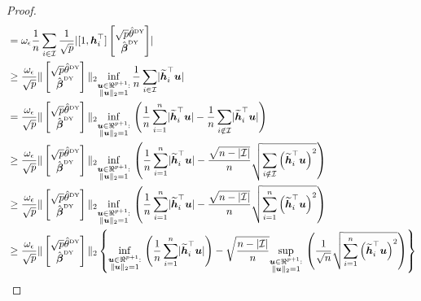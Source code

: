 \documentclass{article}
\makeatletter
\theoremstyle{definition}
\newcommand{\vnorm}[1]{%
	\ensuremath{%
		\if@display
		\left\| #1 \right\|
		\else
		\| #1 \|
		\fi
	}%
}
\newcommand{\abs}[1]{%
	\ensuremath{%
		\if@display
		\left| #1 \right|
		\else
		\lvert #1 \rvert
		\fi
	}%
}
\newcommand*{\bb}{\boldsymbol}
\newcommand{\betady}{\ensuremath{\hat{\bbeta}^{\textrm{\tiny DY}}}}
\newcommand{\thetady}{\ensuremath{\hat{\theta}^{\textrm{\tiny DY}}}}
\def\bu{\bb{u}}
\def\bh{\bb{h}}
\def\bbeta{\bb{\beta}}
\makeatother
\begin{document}
\begin{bibunit}
\begin{proof}
\begin{equation}
\begin{aligned}
		& = \omega_\epsilon\frac{1}{n} \sum_{i \in \mathcal I} \frac{1}{\sqrt{p}} \abs{ [1, \bh_i^\top] \begin{bmatrix} \sqrt{p} \thetady \\ \betady \end{bmatrix}} \\
		&\geq  \frac{\omega_\epsilon}{\sqrt{p}} \vnorm{\begin{bmatrix} \sqrt{p} \thetady \\ \betady \end{bmatrix}}_2   \underset{\substack{\bu \in \Re^{p+1}: \\ \vnorm{\bu}_2  = 1}}{\inf} \, \frac{1}{n} \sum_{i \in \mathcal I} \abs{ \widetilde{\bh}_i^\top \bu } \\
		&=  \frac{\omega_\epsilon}{\sqrt{p}} \vnorm{\begin{bmatrix} \sqrt{p} \thetady \\ \betady \end{bmatrix}}_2   \underset{\substack{\bu \in \Re^{p+1}: \\ \vnorm{\bu}_2  = 1}}{\inf} \, \left( \frac{1}{n}\sum_{i = 1}^n \abs{ \widetilde{\bh}_i^\top \bu }  - \frac{1}{n}\sum_{i \notin \mathcal{I}} \abs{ \widetilde{\bh}_i^\top \bu }\right)\\
		&\geq \frac{\omega_\epsilon}{\sqrt{p}} \vnorm{\begin{bmatrix} \sqrt{p} \thetady \\ \betady \end{bmatrix}}_2   \underset{\substack{\bu \in \Re^{p+1}: \\ \vnorm{\bu}_2  = 1}}{\inf} \, \left( \frac{1}{n}\sum_{i = 1}^n \abs{ \widetilde{\bh}_i^\top \bu }  - \frac{\sqrt{n - \abs{\mathcal I}}}{n} \sqrt{ \sum_{i \notin \mathcal{I}}  \left(\widetilde{\bh}_i^\top \bu \right)^2 }\right)\\
		&\geq  \frac{\omega_\epsilon}{\sqrt{p}} \vnorm{\begin{bmatrix} \sqrt{p} \thetady \\ \betady \end{bmatrix}}_2   \underset{\substack{\bu \in \Re^{p+1}: \\ \vnorm{\bu}_2  = 1}}{\inf} \, \left( \frac{1}{n}\sum_{i = 1}^n \abs{ \widetilde{\bh}_i^\top \bu }  - \frac{\sqrt{n - \abs{\mathcal I}}}{n} \sqrt{ \sum_{i = 1}^n  \left(\widetilde{\bh}_i^\top\bu \right)^2 }\right)\\
		&\geq  \frac{\omega_\epsilon}{\sqrt{p}} \vnorm{\begin{bmatrix} \sqrt{p} \thetady \\ \betady \end{bmatrix}}_2  \left\{ \underset{\substack{\bu \in \Re^{p+1}: \\ \vnorm{\bu}_2  = 1}}{\inf} \, \left( \frac{1}{n}\sum_{i = 1}^n \abs{\widetilde{\bh}_i^\top \bu } \right) -  \sqrt{\frac{n - \abs{\mathcal I}}{n}} \underset{\substack{\bu \in \Re^{p + 1}:\\ \vnorm{\bu}_2 = 1}}{\sup}\, \left(\frac{1}{\sqrt{n}} \sqrt{\sum_{i = 1}^n  \left(\widetilde{\bh}_i^\top \bu \right)^2 }\right)\right\} \\

\end{aligned}
\end{equation}
\end{proof}
\end{bibunit}
\end{document}
